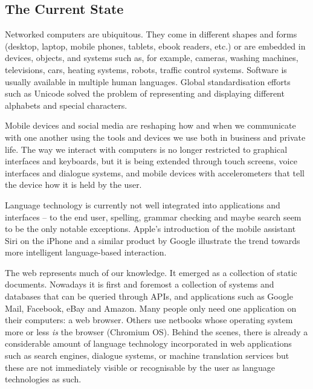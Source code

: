 \documentclass[10pt, plain]{../../metanetpaper}
\begin{document}
\begin{multicols}{2}

\subsection{The Current State}
\label{sec:ict-trends}

Networked computers are ubiquitous. They come in different shapes and forms (desktop, laptop, mobile phones, tablets, ebook readers, etc.) or are embedded in devices, objects, and systems such as, for example, cameras, washing machines, televisions, cars, heating systems, robots, traffic control systems. Software is usually available in multiple human languages. Global standardisation efforts such as Unicode solved the problem of representing and displaying different alphabets and special characters. 

Mobile devices and social media are reshaping how and when we communicate with one another using the tools and devices we use both in business and private life. The way we interact with computers is no longer restricted to graphical interfaces and keyboards, but it is being extended through touch screens, voice interfaces and dialogue systems, and mobile devices with accelerometers that tell the device how it is held by the user.

Language technology is currently not well integrated into applications and interfaces -- to the end user, spelling, grammar checking and maybe search seem to be the only notable exceptions.  Apple’s introduction of the mobile assistant Siri on the iPhone and a similar product by Google illustrate the trend towards more intelligent language-based interaction.

The web represents much of our knowledge. It emerged as a collection of static documents. Nowadays it is first and foremost a collection of systems and databases that can be queried through APIs, and applications such as Google Mail, Facebook, eBay and Amazon. Many people only need one application on their computers: a web browser. Others use netbooks whose operating system more or less \emph{is} the browser (Chromium OS). Behind the scenes, there is already a considerable amount of language technology incorporated in web applications such as search engines, dialogue systems, or machine translation services but these are not immediately visible or recognisable by the user as language technologies as such.



\end{multicols}
\end{document}
